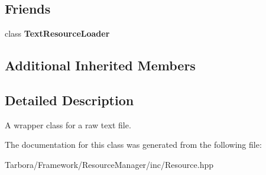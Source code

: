 \subsection*{Friends}
\begin{DoxyCompactItemize}
\item 
\mbox{\label{classTarbora_1_1Text_ad100d8767ed491d6e80636c2b83ac605}} 
class {\bfseries Text\+Resource\+Loader}
\end{DoxyCompactItemize}
\subsection*{Additional Inherited Members}


\subsection{Detailed Description}
A wrapper class for a raw text file. 

The documentation for this class was generated from the following file\+:\begin{DoxyCompactItemize}
\item 
Tarbora/\+Framework/\+Resource\+Manager/inc/Resource.\+hpp\end{DoxyCompactItemize}
